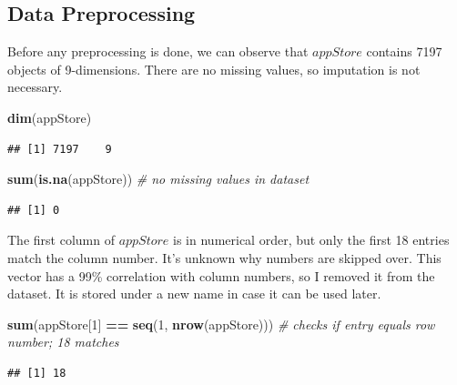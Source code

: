 \documentclass[]{article}
\newenvironment{Shaded}{\begin{snugshade}}{\end{snugshade}}
\newcommand{\CommentTok}[1]{\textcolor[rgb]{0.56,0.35,0.01}{\textit{#1}}}
\newcommand{\DecValTok}[1]{\textcolor[rgb]{0.00,0.00,0.81}{#1}}
\newcommand{\KeywordTok}[1]{\textcolor[rgb]{0.13,0.29,0.53}{\textbf{#1}}}
\newcommand{\NormalTok}[1]{#1}
\newcommand{\OperatorTok}[1]{\textcolor[rgb]{0.81,0.36,0.00}{\textbf{#1}}}
\newcommand{\StringTok}[1]{\textcolor[rgb]{0.31,0.60,0.02}{#1}}
\begin{document}
\hypertarget{data-preprocessing}{%
\subsection{Data Preprocessing}\label{data-preprocessing}}

Before any preprocessing is done, we can observe that
\(\textit{appStore}\) contains 7197 objects of 9-dimensions. There are
no missing values, so imputation is not necessary.

\begin{Shaded}
\begin{Highlighting}[]
\KeywordTok{dim}\NormalTok{(appStore)}
\end{Highlighting}
\end{Shaded}

\begin{verbatim}
## [1] 7197    9
\end{verbatim}

\begin{Shaded}
\begin{Highlighting}[]
\KeywordTok{sum}\NormalTok{(}\KeywordTok{is.na}\NormalTok{(appStore))  }\CommentTok{# no missing values in dataset}
\end{Highlighting}
\end{Shaded}

\begin{verbatim}
## [1] 0
\end{verbatim}

The first column of \(\textit{appStore}\) is in numerical order, but
only the first 18 entries match the column number. It's unknown why
numbers are skipped over. This vector has a 99\% correlation with column
numbers, so I removed it from the dataset. It is stored under a new name
in case it can be used later.

\begin{Shaded}
\begin{Highlighting}[]
\KeywordTok{sum}\NormalTok{(appStore[}\DecValTok{1}\NormalTok{] }\OperatorTok{==}\StringTok{ }\KeywordTok{seq}\NormalTok{(}\DecValTok{1}\NormalTok{, }\KeywordTok{nrow}\NormalTok{(appStore)))  }\CommentTok{# checks if entry equals row number; 18 matches}
\end{Highlighting}
\end{Shaded}

\begin{verbatim}
## [1] 18
\end{verbatim}

\begin{Shaded}
\end{Shaded}
\end{document}
